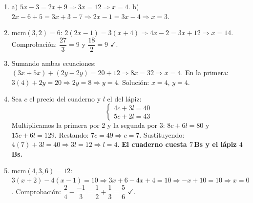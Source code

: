\documentclass[12pt, letterpaper]{article}
\begin{document}
  \begin{enumerate}[leftmargin=*, label=\textbf{\arabic*.}]
    \item a) $5x - 3 = 2x + 9 \Rightarrow 3x = 12 \Rightarrow x = 4$. \quad
          b) $2x - 6 + 5 = 3x + 3 - 7 \Rightarrow 2x - 1 = 3x - 4 \Rightarrow x = 3$.

    \item mcm$(3,2) = 6$: $2(2x - 1) = 3(x + 4) \Rightarrow 4x - 2 = 3x + 12 \Rightarrow x = 14$.
          Comprobación: $\dfrac{27}{3} = 9$ y $\dfrac{18}{2} = 9$ $\checkmark$.

    \item Sumando ambas ecuaciones: $(3x + 5x) + (2y - 2y) = 20 + 12 \Rightarrow 8x = 32 \Rightarrow x = 4$.
          En la primera: $3(4) + 2y = 20 \Rightarrow 2y = 8 \Rightarrow y = 4$. \quad Solución: $x = 4$, $y = 4$.

    \item Sea $c$ el precio del cuaderno y $l$ el del lápiz:
          \[
            \begin{cases} 4c + 3l = 40 \\ 5c + 2l = 43 \end{cases}
          \]
          Multiplicamos la primera por 2 y la segunda por 3: $8c + 6l = 80$ y $15c + 6l = 129$.
          Restando: $7c = 49 \Rightarrow c = 7$. \quad Sustituyendo: $4(7) + 3l = 40 \Rightarrow 3l = 12 \Rightarrow l = 4$.
          \textbf{El cuaderno cuesta $7$\,Bs y el lápiz $4$\,Bs.}

    \item mcm$(4,3,6) = 12$: $3(x + 2) - 4(x - 1) = 10 \Rightarrow 3x + 6 - 4x + 4 = 10 \Rightarrow -x + 10 = 10 \Rightarrow x = 0$.
          Comprobación: $\dfrac{2}{4} - \dfrac{-1}{3} = \dfrac{1}{2} + \dfrac{1}{3} = \dfrac{5}{6}$ $\checkmark$.
  \end{enumerate}

\fi
\end{document}
